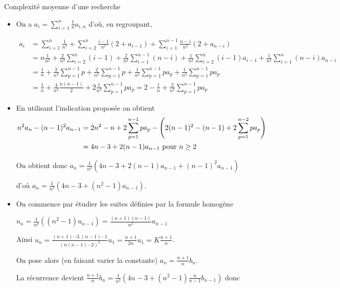 \begin{exo}{Complexité moyenne d'une recherche}{}
\begin{itemize}
L'espérance est donc $\displaystyle \frac 1n+\frac {i-1}n(2+a_{i-1}) + \frac {n-i}n(2+a_{n-i})$.

Pour $i=1$ ou $i=n$ on trouver la valeur $\displaystyle \frac 1n+ \frac {n-1}n(2+a_{n-1})$.

\item On a $\displaystyle a_i = \sum_{i=1}^n \frac 1n a_{i,n}$ d'où, en regroupant,

\begin{align*}
a_i 
&= \sum_{i=1}^n \frac 1{n^2} 
 + \sum_{i=2}^n \frac {i-1}{n^2}(2+a_{i-1})
 + \sum_{i=1}^{n-1} \frac {n-i}{n^2}(2+a_{n-i})
\\&
 =n\frac 1{n^2} + \frac 2{n^2}\sum_{i=2}^n (i-1) + \frac 2{n^2}\sum_{i=1}^{n-1} (n-i)
 + \frac 1{n^2}\sum_{i=2}^n (i-1)a_{i-1}
 + \frac 1{n^2}\sum_{i=1}^n (n-i)a_{n-i}
\\ &
 =\frac 1n + \frac 2{n^2}\sum_{p=1}^{n-1} p +\frac 2{n^2}\sum_{p=1}^{n-1} p
 + \frac 1{n^2}\sum_{p=1}^{n-1} pa_p
 + \frac 1{n^2}\sum_{p=1}^{n-1} pa_p
\\ &
 =\frac 1n + \frac 4{n^2}\frac {n(n-1)}2
 + 2\frac 1{n^2}\sum_{p=1}^{n-1} pa_p
 = 2 -\frac 1n + \frac 2{n^2}\sum_{p=1}^{n-1} pa_p
\end{align*}

\item En utilisant l'indication proposée on obtient
\begin{align*}
n^2a_n-(n-1)^2a_{n-1}
&
=2n^2-n+2\sum_{p=1}^{n-1} pa_p
-\left(2(n-1)^2-(n-1)+2\sum_{p=1}^{n-2} pa_p\right)
\cr &
=4n-3+2(n-1)a_{n-1}\hbox{ pour }n \ge 2
\end{align*}

On obtient donc $\displaystyle a_n = \frac 1{n^2}\left(4n-3+2(n-1)a_{n-1} + (n-1)^2a_{n-1}\right)$

d'où $\displaystyle a_n = \frac 1{n^2}\left(4n-3+(n^2-1)a_{n-1}\right)$.

\item On commence par étudier les suites définies par la formule homogène 

$\displaystyle u_n = \frac 1{n^2}\left((n^2-1)u_{n-1}\right) = \frac{(n+1)(n-1)}{n^2} u_{n-1}$

Ainsi $\displaystyle u_n = \frac{(n+1) \cdots 3.(n-1)\cdots 1}{(n(n-1)\cdots 2)^2}u_1
=\frac{n+1}{2n}u_1=K\frac{n+1}n$.

On pose alors (en faisant varier la constante) $a_n = \frac{n+1}{n}b_n$.

La récurrence devient $\displaystyle \frac{n+1}{n}b_n 
= \frac 1{n^2}\left(4n-3+(n^2-1)\frac n{n-1}b_{n-1}\right)$ donc


\end{itemize}
\end{exo}
